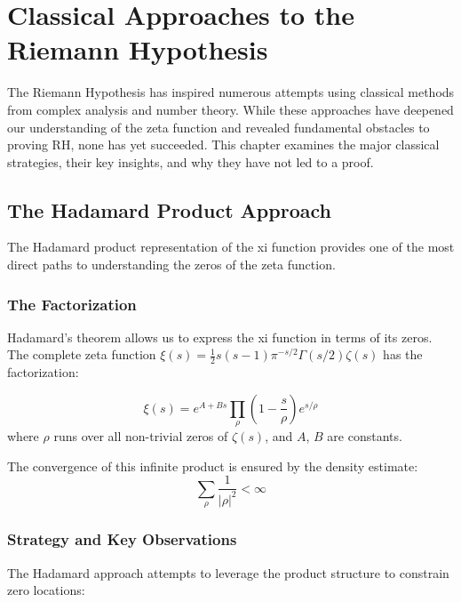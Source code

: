 \chapter{Classical Approaches to the Riemann Hypothesis}

The Riemann Hypothesis has inspired numerous attempts using classical methods from complex analysis and number theory. While these approaches have deepened our understanding of the zeta function and revealed fundamental obstacles to proving RH, none has yet succeeded. This chapter examines the major classical strategies, their key insights, and why they have not led to a proof.

\section{The Hadamard Product Approach}

The Hadamard product representation of the xi function provides one of the most direct paths to understanding the zeros of the zeta function.

\subsection{The Factorization}

Hadamard's theorem allows us to express the xi function in terms of its zeros. The complete zeta function $\xi(s) = \frac{1}{2}s(s-1)\pi^{-s/2}\Gamma(s/2)\zeta(s)$ has the factorization:

\begin{theorem}
\begin{equation}
\xi(s) = e^{A+Bs} \prod_{\rho} \left(1 - \frac{s}{\rho}\right)e^{s/\rho}
\end{equation}
where $\rho$ runs over all non-trivial zeros of $\zeta(s)$, and $A$, $B$ are constants.
\end{theorem}

The convergence of this infinite product is ensured by the density estimate:
\begin{equation}
\sum_{\rho} \frac{1}{|\rho|^2} < \infty
\end{equation}

\subsection{Strategy and Key Observations}

The Hadamard approach attempts to leverage the product structure to constrain zero locations:


